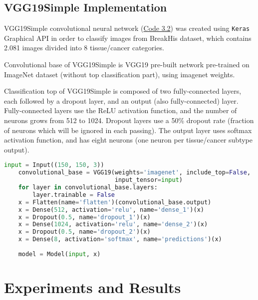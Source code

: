 \subsection{VGG19Simple Implementation}

VGG19Simple convolutional neural network (\textcolor{red}{\hyperref[src:py2]{Code 3.2}}) was created using \texttt{Keras} Graphical API in order to classify images from BreakHis dataset, which contains 2.081 images divided into 8 tissue/cancer categories. 

Convolutional base of VGG19Simple is VGG19 \cite{simonyan2014very} pre-built network pre-trained on ImageNet \cite{deng2009imagenet} dataset (without top classification part), using imagenet weights.

Classification top of VGG19Simple is composed of two fully-connected layers, each followed by a dropout layer, and an output (also fully-connected) layer. Fully-connected layers use the ReLU activation function, and the number of neurons grows from 512 to 1024. Dropout layers use a 50\% dropout rate (fraction of neurons which will be ignored in each passing). The output layer uses softmax activation function, and has eight neurons (one neuron per tissue/cancer subtype output). 

\vspace{3mm}
\begin{lstlisting}[language={Python}, basicstyle=\scriptsize]
	input = Input((150, 150, 3))
	convolutional_base = VGG19(weights='imagenet', include_top=False,
	                           input_tensor=input)
	for layer in convolutional_base.layers:
		layer.trainable = False
	x = Flatten(name='flatten')(convolutional_base.output)
	x = Dense(512, activation='relu', name='dense_1')(x)
	x = Dropout(0.5, name='dropout_1')(x)
	x = Dense(1024, activation='relu', name='dense_2')(x)
	x = Dropout(0.5, name='dropout_2')(x)
	x = Dense(8, activation='softmax', name='predictions')(x)
	
	model = Model(input, x)
\end{lstlisting} 

\section{Experiments and Results}
\label{exp}

